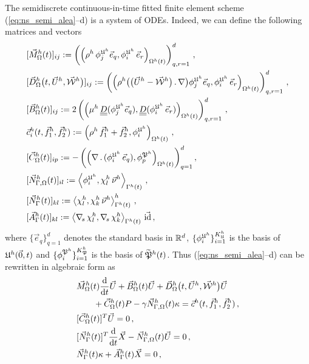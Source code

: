 The semidiscrete continuous-in-time fitted finite element scheme
(\ref{eq:ns_semi_alea}--d) is a system of ODEs. Indeed, we can define the
following matrices and vectors
\begin{subequations}
\begin{align}
& [\vec M^h_\Omega(t)]_{ij} :=
\left(\left(\rho^h\,\phi_j^{\uspacesimpleale^h}\vec e_q,
\phi_i^{\uspacesimpleale^h}\,\vec e_r \right)_{\Omega^h(t)}
\right)_{q,r=1}^d\,, \label{eq:ns_ale_mata}\\
& [\vec D^h_\Omega\big(t,\vec U^h,\W^h\big)]_{ij} :=
\left(\left(\rho^h\big(\big(\vec U^h-\W^h\big)\,.\,\nabla\big)
\phi_j^{\uspacesimpleale^h} \vec e_q, \phi_i^{\uspacesimpleale^h}\,\vec e_r
\right)_{\Omega^h(t)} \right)_{q,r=1}^d\,,\label{eq:ns_ale_matb}\\
& [\vec B^h_\Omega(t)]_{ij} :=
2\left(\left(\mu^h\,\mat D(\phi_j^{\uspacesimpleale^h}\vec e_q),
\mat D(\phi_i^{\uspacesimpleale^h}\,\vec e_r) \right)_{\Omega^h(t)}
\right)_{q,r=1}^d\,,\label{eq:ns_ale_matc}\\
& \vec c^h_i(t,\vec f_1^h,\vec f_2^h) := \left( \rho^h\,\vec f_1^h + \vec f_2^h,
\phi_i^{\uspacesimpleale^h}\right)_{\Omega^h(t)}\,,\label{eq:ns_ale_matd}\\
&[\vec C^h_\Omega(t)]_{ip} := - \left(
\left(\nabla\,.\,(\phi_i^{\uspacesimpleale^h}\,\vec e_q), \phi_p^{\pspaceale^h}
\right)_{\Omega^h(t)} \right)_{q=1}^d,\label{eq:ns_ale_mate}\\
& [\Nbulk^h(t)]_{il} := \left\langle \phi_i^{\uspacesimpleale^h}, \chi^h_l
\,\vec\nu^h \right\rangle_{\Gamma^h(t)} \,,\label{eq:ns_ale_matf}\\
& [\vec N_\Gamma^h(t)]_{kl} := \left\langle \chi^h_l, \chi^h_k\,\vec\nu^h
\right\rangle_{\Gamma^h(t)}^h \,,\label{eq:ns_ale_matg}\\
& [\vec A^h_\Gamma(t)]_{kl} := \left\langle \nabs\,\chi^h_l, \nabs\,\chi^h_k
\right\rangle_{\Gamma^h(t)} \,\vec\id \,,\label{eq:ns_ale_math}
\end{align}
\end{subequations}
where $\{\vec e_q\}_{q=1}^d$ denotes the standard basis in $\R^d$,
$\{\phi_i^{\uspacesimpleale^h}\}_{i=1}^{K^h_\uspacesimpleale}$ is the basis of
$\uspacesemidiscale{0}{h}{t}$ and
$\{\phi_i^{\pspaceale^h}\}_{i=1}^{K^h_\pspaceale}$ is the  basis of
$\pnormspaceale^h(t)$. Thus (\ref{eq:ns_semi_alea}--d) can be rewritten in
algebraic form as
\begin{subequations}
\begin{align}
& \vec M^h_\Omega(t)\ddt \vec U + \vec B^h_\Omega(t) \vec U +
\vec D^h_\Omega\big(t,\vec U^h,\W^h\big)\vec U \nonumber \\
& \qquad + \vec C^h_\Omega(t) P
- \gamma \Nbulk^h(t) \kappa = \vec c^h(t,\vec f_1^h,\vec f_2^h)\,,
\label{eq:ns_ode_alea} \\
& [\vec C^h_\Omega(t) ]^T \vec U = 0\,, \label{eq:ns_ode_aleb} \\
& [\vec N_\Gamma^h(t)]^T \ddt \vec X - \Nbulk^h(t)\vec U = 0\,,
\label{eq:ns_ode_alec} \\
& \vec N_\Gamma^h(t) \kappa + \vec A^h_\Gamma(t)\vec X = 0\,,
\label{eq:ns_ode_aled}
\end{align}
\end{subequations}
